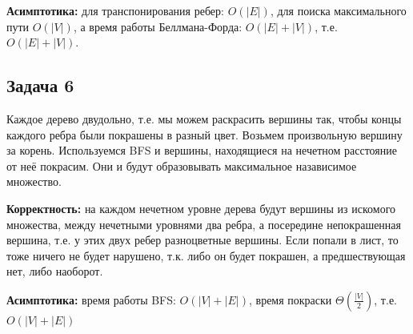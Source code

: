 \documentclass[a4paper,14pt]{article} %
\begin{document}
\textbf{Асимптотика:} для транспонирования ребер: $O(|E|)$, для поиска максимального пути $O(|V|)$, а время работы Беллмана-Форда: $O(|E|+|V|)$, т.е. $O(|E|+|V|)$.

\subsection{Задача 6}
Каждое дерево двудольно, т.е. мы можем раскрасить вершины так, чтобы концы каждого ребра были покрашены в разный цвет. Возьмем произвольную вершину за корень. Используемся BFS и вершины, находящиеся на нечетном расстояние от неё покрасим.
Они и будут образовывать максимальное назависимое множество.

\textbf{Корректность: } на каждом нечетном уровне дерева будут вершины из искомого множества, между нечетными уровнями два ребра, а посередине непокрашенная вершина, т.е. у этих двух ребер разноцветные вершины.
Если попали в лист, то тоже ничего не будет нарушено, т.к. либо он будет покрашен, а предшествующая нет, либо наоборот.

\textbf{Асимптотика:} время работы BFS: $O(|V|+|E|)$, время покраски $\Theta(\frac{|V|}{2})$, т.е. $O(|V|+|E|)$
\end{document}
